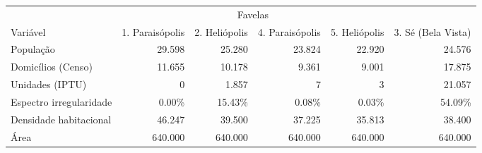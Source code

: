 \begingroup
\fontsize{9.0pt}{10.8pt}\selectfont
\begin{longtable}{lrrrrr}
\toprule
 & \multicolumn{4}{c}{Favelas} &  \\ 
\cmidrule(lr){2-5}
Variável & 1. Paraisópolis & 2. Heliópolis  & 4. Paraisópolis & 5. Heliópolis & 3. Sé (Bela Vista) \\ 
\midrule\addlinespace[2.5pt]
População & 29.598 & 25.280 & 23.824 & 22.920 & 24.576 \\ 
Domicílios (Censo) & 11.655 & 10.178 & 9.361 & 9.001 & 17.875 \\ 
Unidades (IPTU) & 0 & 1.857 & 7 & 3 & 21.057 \\ 
Espectro irregularidade & 0.00\% & 15.43\% & 0.08\% & 0.03\% & 54.09\% \\ 
Densidade habitacional & 46.247 & 39.500 & 37.225 & 35.813 & 38.400 \\ 
Área & 640.000 & 640.000 & 640.000 & 640.000 & 640.000 \\ 
\bottomrule
\end{longtable}
\endgroup

